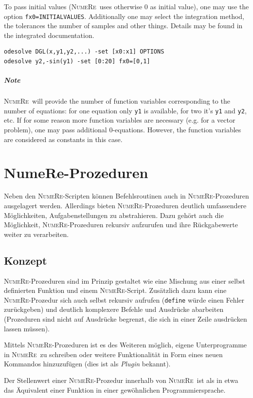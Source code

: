 \documentclass[DIV=14,headsepline,footsepline]{scrbook}
\newcommand{\NR}{\textsc{Nu\-me\-Re}}
\begin{document}
				To pass initial values (\NR\ uses otherwise 0 as initial value), one may use the option \verb+fx0=INITIALVALUES+. Additionally one may select the integration method, the tolerances the number of samples and other things. Details may be found in the integrated documentation.
				\begin{lstlisting}
odesolve DGL(x,y1,y2,...) -set [x0:x1] OPTIONS
odesolve y2,-sin(y1) -set [0:20] fx0=[0,1]
				\end{lstlisting}
				\paragraph{Note} \NR\ will provide the number of function variables corresponding to the number of equations: for one equation only \verb+y1+ is available, for two it's \verb+y1+ and \verb+y2+, etc. If for some reason more function variables are necessary (e.g. for a vector problem), one may pass additional 0-equations. However, the function variables are considered as constants in this case.
				
		\chapter{NumeRe-Prozeduren}
			Neben den \NR-Scripten können Befehlsroutinen auch in \NR-Prozeduren ausgelagert werden. Allerdings bieten \NR-Prozeduren deutlich umfassendere Möglichkeiten, Aufgabenstellungen zu abstrahieren. Dazu gehört auch die Möglichkeit, \NR-Prozeduren rekursiv aufzurufen und ihre Rückgabewerte weiter zu verarbeiten.
			\section{Konzept}
				\NR-Prozeduren sind im Prinzip gestaltet wie eine Mischung aus einer selbst definierten Funktion und einem \NR-Script. Zusätzlich dazu kann eine \NR-Prozedur sich auch selbst rekursiv aufrufen (\verb+define+ würde einen Fehler zurückgeben) und deutlich komplexere Befehle und Ausdrücke abarbeiten (Prozeduren sind nicht auf Ausdrücke begrenzt, die sich in einer Zeile ausdrücken lassen müssen).
				
				Mittels \NR-Prozeduren ist es des Weiteren möglich, eigene Unterprogramme in \NR\ zu schreiben oder weitere Funktionalität in Form eines neuen Kommandos hinzuzufügen (dies ist als \emph{Plugin} bekannt).
				
				Der Stellenwert einer \NR-Prozedur innerhalb von \NR\ ist als in etwa das Äquivalent einer Funktion in einer gewöhnlichen Programmiersprache.
				
\end{document}
